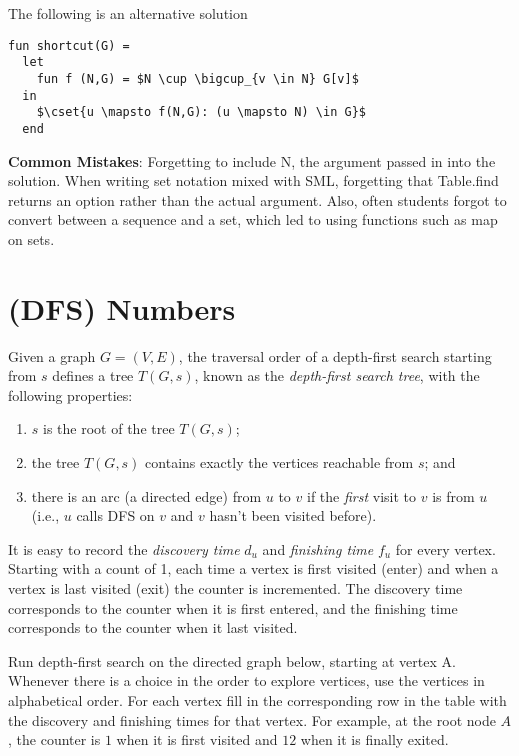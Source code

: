 \begin{problem}
\notes
The following is an alternative solution
\begin{lstlisting}[numbers=none]
fun shortcut(G) = 
  let 
    fun f (N,G) = $N \cup \bigcup_{v \in N} G[v]$
  in   
    $\cset{u \mapsto f(N,G): (u \mapsto N) \in G}$
  end
\end{lstlisting}

\textbf{Common Mistakes}: Forgetting to include N, the argument passed in into the solution. When writing set notation mixed with SML, forgetting that Table.find returns an option rather than the actual argument. Also, often students forgot to convert between a sequence and a set, which led to using functions such as map on sets.

\end{problem}



\section{(DFS) Numbers}

Given a graph $G = (V,E)$, the traversal order of a depth-first search starting
from $s$ defines a tree $T(G, s)$, known as the \emph{depth-first search tree},
with the following properties:
\begin{enumerate}[itemsep=2pt,topsep=0pt,label=(\roman*),
  labelindent=2\parindent,
  leftmargin=*]
\item $s$ is the root of the tree $T(G,s)$;
\item the tree $T(G,s)$ contains exactly the vertices reachable from $s$; and
\item there is an arc (a directed edge) from $u$ to $v$ if the
  \emph{first} visit to $v$ is
from $u$ (i.e., $u$ calls DFS on $v$ and $v$ hasn't been visited before).
\end{enumerate}

It is easy to record the \emph{discovery time} $d_u$ and
\emph{finishing time} $f_u$ for every vertex.  Starting with a count
of 1, each time a vertex is
first visited (enter) and when a vertex is
last visited (exit) the counter is incremented.  The discovery time
corresponds to the counter when it is first entered, and the finishing
time corresponds to the counter when it last visited.



Run depth-first search on the directed graph below, starting at vertex
A. Whenever there is a choice in the order to explore vertices, use
the vertices in alphabetical order.
For each vertex fill in the corresponding row in the
table with the discovery and finishing
times for that vertex. For example, at the root node $A$, the
counter is $1$ when it is first visited and $12$ when it is finally exited.



